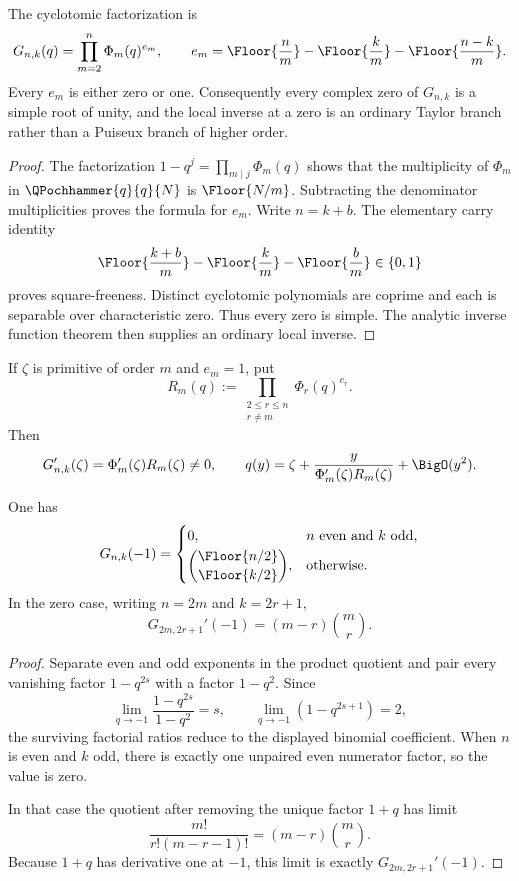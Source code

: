 \begin{theorem}
\label{thm:gq-square-free}
The cyclotomic factorization is
\[
  G_{n,k}(q)=\prod_{m=2}^{n}\Phi_m(q)^{e_m},
  \qquad
  e_m=\Floor{\frac nm}
      -\Floor{\frac km}
      -\Floor{\frac{n-k}{m}}.
\]
Every \(e_m\) is either zero or one.  Consequently every complex zero of
\(G_{n,k}\) is a simple root of unity, and the local inverse at a zero is an
ordinary Taylor branch rather than a Puiseux branch of higher order.
\end{theorem}

\begin{proof}
The factorization \(1-q^j=\prod_{m\mid j}\Phi_m(q)\) shows that the
multiplicity of \(\Phi_m\) in \(\QPochhammer{q}{q}{N}\) is
\(\Floor{N/m}\).
Subtracting the denominator multiplicities proves the formula for \(e_m\).
Write \(n=k+b\).  The elementary carry identity
\[
  \Floor{\frac{k+b}{m}}
  -\Floor{\frac{k}{m}}
  -\Floor{\frac{b}{m}}\in\{0,1\}
\]
proves square-freeness.  Distinct cyclotomic polynomials are coprime and each
is separable over characteristic zero.  Thus every zero is simple.  The
analytic inverse function theorem then supplies an ordinary local inverse.
\end{proof}

If \(\zeta\) is primitive of order \(m\) and \(e_m=1\), put
\[
  R_m(q):=\prod_{\substack{2\le r\le n\\r\ne m}}\Phi_r(q)^{e_r}.
\]
Then
\[
  G_{n,k}'(\zeta)=\Phi_m'(\zeta)R_m(\zeta)\ne0,
  \qquad
  q(y)=\zeta+
  \frac{y}{\Phi_m'(\zeta)R_m(\zeta)}+\BigO(y^2).
\]

\begin{proposition}[Value and derivative at \(q=-1\)]
\label{prop:gq-minus-one}
One has
\[
  G_{n,k}(-1)=
  \begin{cases}
  0,&n\text{ even and }k\text{ odd},\\[0.25em]
  \displaystyle
  \binom{\Floor{n/2}}{\Floor{k/2}},
  &\text{otherwise}.
  \end{cases}
\]
In the zero case, writing \(n=2m\) and \(k=2r+1\),
\[
  G_{2m,2r+1}'(-1)=(m-r)\binom mr.
\]
\end{proposition}

\begin{proof}
Separate even and odd exponents in the product quotient and pair every
vanishing factor \(1-q^{2s}\) with a factor \(1-q^2\).  Since
\[
  \lim_{q\to-1}\frac{1-q^{2s}}{1-q^2}=s,
  \qquad
  \lim_{q\to-1}(1-q^{2s+1})=2,
\]
the surviving factorial ratios reduce to the displayed binomial coefficient.
When \(n\) is even and \(k\) odd, there is exactly one unpaired even numerator
factor, so the value is zero.

In that case the quotient after removing the unique factor \(1+q\) has limit
\[
  \frac{m!}{r!(m-r-1)!}=(m-r)\binom mr.
\]
Because \(1+q\) has derivative one at \(-1\), this limit is exactly
\(G_{2m,2r+1}'(-1)\).
\end{proof}

